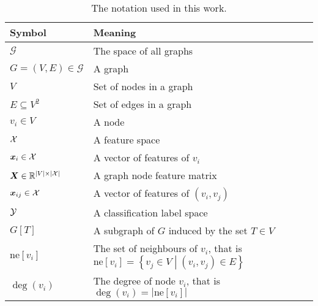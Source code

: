 \begin{table}
	\begin{ctucolortab}
		\begin{tabular}{p{0.25\linewidth}p{0.75\linewidth}}
			\toprule
			\textbf{Symbol} & \textbf{Meaning} \\
			\midrule
			\( \mathcal{G} \) & The space of all graphs \\
			\( G = \left( V, E \right) \in \mathcal{G} \) & A graph \\
			\( V \) & Set of nodes in a graph \\
			\( E \subseteq V^2 \) & Set of edges in a graph \\
			\( v_i \in V \) & A node \\
			\( \mathcal{X} \) & A feature space \\
			\( \bm{x}_i \in \mathcal{X} \) & A vector of features of \( v_i \) \\
			\( \bm{X} \in \mathbb{R}^{\left\lvert V \right\rvert \times \left\lvert \mathcal{X} \right\rvert} \) & A graph node feature matrix	\\
			\( \bm{x}_{ij} \in \mathcal{X} \) & A vector of features of \( \left( v_i, v_j \right) \) \\
			\( \mathcal{Y} \) & A classification label space \\
			\( G \left[ T \right] \) & A subgraph of \( G \) induced by the set \( T \in V \) \\
			\( \mathrm{ne}[v_i] \) & The set of neighbours of \( v_i \), that is \( \mathrm{ne}[v_i] = \left\{ v_j \in V \middle| \left( v_i, v_j \right) \in E \right\} \) \\
			\( \deg \left( v_i \right) \) & The degree of node \( v_i \), that is \( \deg \left( v_i \right) = \left\lvert \mathrm{ne}[v_i] \right\rvert \) \\
			\bottomrule
		\end{tabular}
	\end{ctucolortab}
	\caption{The notation used in this work.}
	\label{tab:notation}
\end{table}
